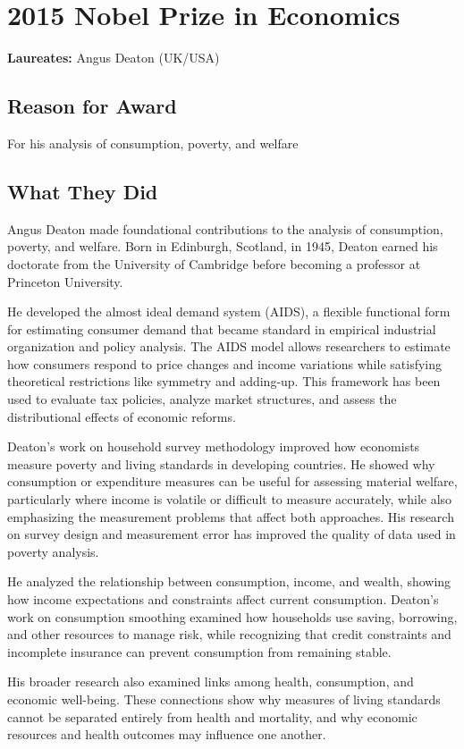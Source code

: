 \chapter{2015 Nobel Prize in Economics}
\textbf{Laureates: }Angus Deaton (UK/USA)

\section*{Reason for Award}
For his analysis of consumption, poverty, and welfare

\section{What They Did}
Angus Deaton made foundational contributions to the analysis of consumption,
poverty, and welfare. Born in Edinburgh, Scotland, in 1945, Deaton earned his
doctorate from the University of Cambridge before becoming a professor at
Princeton University.

He developed the almost ideal demand system (AIDS), a flexible functional form
for estimating consumer demand that became standard in empirical industrial
organization and policy analysis. The AIDS model allows researchers to estimate
how consumers respond to price changes and income variations while satisfying
theoretical restrictions like symmetry and adding-up. This framework has been
used to evaluate tax policies, analyze market structures, and assess the
distributional effects of economic reforms.

Deaton's work on household survey methodology improved how economists measure
poverty and living standards in developing countries. He showed why consumption
or expenditure measures can be useful for assessing material welfare, particularly
where income is volatile or difficult to measure accurately, while also emphasizing
the measurement problems that affect both approaches. His research on survey
design and measurement error has improved the quality of data used in poverty
analysis.

He analyzed the relationship between consumption, income, and wealth, showing
how income expectations and constraints affect current consumption. Deaton's work
on consumption smoothing examined how households use saving, borrowing, and other
resources to manage risk, while recognizing that credit constraints and incomplete
insurance can prevent consumption from remaining stable.

His broader research also examined links among health, consumption, and economic
well-being. These connections show why measures of living standards cannot be
separated entirely from health and mortality, and why economic resources and
health outcomes may influence one another.

